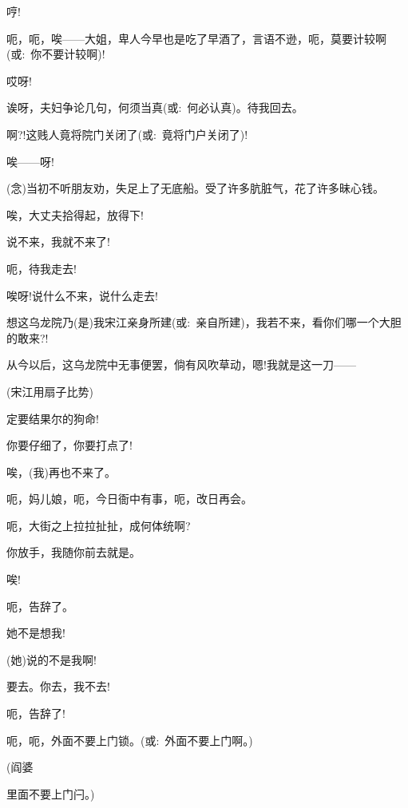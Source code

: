 {{哼!}


{呃，呃，唉------大姐，卑人今早也是吃了早酒了，言语不逊，呃，莫要计较啊({\akai 或}:~你不要计较啊)!}

{哎呀!}


{诶呀，夫妇争论几句，何须当真({\akai 或}:~何必认真)。待我回去。}

{啊?!这贱人竟将院门关闭了({\akai 或}:~竟将门户关闭了)!}

{唉------呀!}

{({\akai 念})当初不听朋友劝，失足上了无底船。受了许多肮脏气，花了许多昧心钱。}

{唉，大丈夫拾得起，放得下!}

{说不来，我就不来了!}

{呃，待我走去!}

{唉呀!说什么不来，说什么走去!}

{想这乌龙院乃(是)我宋江亲身所建}({\akai 或}:~亲自所建){，我若不来，看你们哪一个大胆的敢来?!}

{从今以后，这乌龙院中无事便罢，倘有风吹草动，嗯!我就是这一刀------}

{(宋江用扇子比势)}

{定要结果尔的狗命!}

{你要仔细了，你要打点了!}

{唉，(我)再也不来了。}

{\vspace{5pt}}

{呃，妈儿娘，呃，今日衙中有事，呃，改日再会。}

{呃，大街之上拉拉扯扯，成何体统啊?}

{你放手，我随你前去就是。}

{唉!}

{呃，告辞了。}

{她不是想我!}

{(她)说的不是我啊!}

{要去。你去，我不去!}

{呃，告辞了!}

{呃，呃，外面不要上门锁。({\akai 或}:~外面不要上门啊。)}

{(阎婆

里面不要上门闩。)}

}
